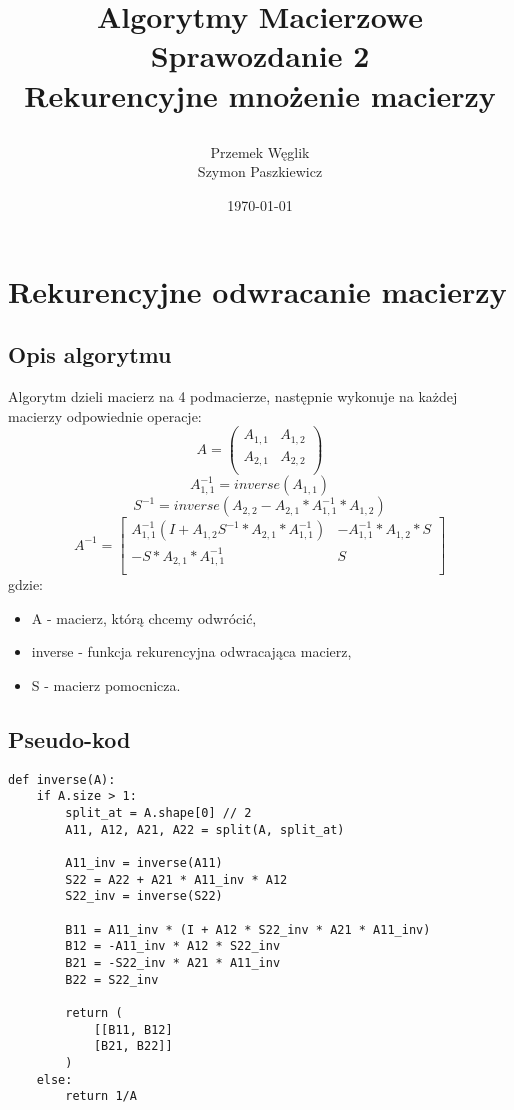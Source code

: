 \documentclass{article}
\title {
        Algorytmy Macierzowe \\
        Sprawozdanie 2 \\
        Rekurencyjne mnożenie macierzy

}
\author{Przemek Węglik \\ Szymon Paszkiewicz}
\date{\today}
\begin{document}
\maketitle

\tableofcontents

\newpage

\section{Rekurencyjne odwracanie macierzy}

\subsection{Opis algorytmu}
\qquad Algorytm dzieli macierz na 4 podmacierze, następnie wykonuje na każdej macierzy odpowiednie operacje:
\begin{equation}
A = 
     \begin{pmatrix}
      A_{1,1} & A_{1,2}  \\
      A_{2,1} & A_{2,2} \\
     \end{pmatrix}
\end{equation}
\begin{equation}
A_{1,1}^{-1} = inverse(A_{1,1})
\end{equation}
\begin{equation}
S^{-1} = inverse(A_{2,2} - A_{2,1} * A_{1,1}^{-1} * A_{1,2})
\end{equation}
\begin{equation}
A^{-1} =      
\begin{bmatrix}
      A_{1,1}^{-1}(I + A_{1,2}S^{-1} * A_{2,1} * A_{1,1}^{-1}) &
      -A_{1,1}^{-1} * A_{1,2} * S  \\
      -S * A_{2,1} * A_{1,1}^{-1} & S \\
    \end{bmatrix}
\end{equation}
gdzie:
\begin{itemize}
    \item[] A - macierz, którą chcemy odwrócić,
    \item[] inverse - funkcja rekurencyjna odwracająca macierz,
    \item[] S - macierz pomocnicza.
\end{itemize}

\subsection{Pseudo-kod}
\begin{lstlisting}
def inverse(A):
    if A.size > 1:
        split_at = A.shape[0] // 2
        A11, A12, A21, A22 = split(A, split_at)

        A11_inv = inverse(A11)
        S22 = A22 + A21 * A11_inv * A12
        S22_inv = inverse(S22)

        B11 = A11_inv * (I + A12 * S22_inv * A21 * A11_inv)
        B12 = -A11_inv * A12 * S22_inv
        B21 = -S22_inv * A21 * A11_inv
        B22 = S22_inv

        return (
            [[B11, B12]
            [B21, B22]]
        )
    else:
        return 1/A
\end{lstlisting}
\end{document}
